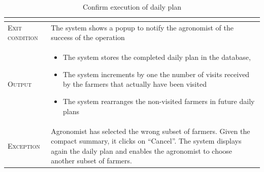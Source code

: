 \begin{table}[H]
\begin{tabular}[c]{|l|p{}|}
\begin{itemize}
                                        \end{itemize}\\
        \hline %
        \textsc{Exit condition}    &  The system shows a popup to notify the agronomist of the success of the operation
        \\
    	\hline %
    	\textsc{Output}             &  \begin{itemize}
    	    \item The system stores the completed daily plan in the database, 
            \item The system increments by one the number of visits received by the farmers that actually have been visited
            \item The system rearranges the non-visited farmers in future daily plans

    	\end{itemize}\\
    	\hline %
    	\textsc{Exception}         &  Agronomist has selected the wrong subset of farmers. Given the compact summary, it clicks on “Cancel”. The system displays again the daily plan and enables the agronomist to choose another subset of farmers.\\
    	
    	\hline %
        
    \end{tabular}
    \caption{\label{tab:confirm_deviations_section}Confirm execution of daily plan}
\end{table}

